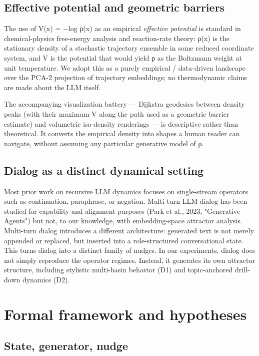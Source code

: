\documentclass{article}
\theoremstyle{plain}
\theoremstyle{definition}
\begin{document}
\subsection{Effective potential and geometric barriers}

The use of V(x) = −log ρ(x) as an empirical \textit{effective potential} is
standard in chemical-physics free-energy analysis and reaction-rate
theory: ρ(x) is the stationary density of a stochastic trajectory
ensemble in some reduced coordinate system, and V is the potential
that would yield ρ as the Boltzmann weight at unit temperature. We
adopt this as a purely empirical / data-driven landscape over the
PCA-2 projection of trajectory embeddings; no thermodynamic claims
are made about the LLM itself.

The accompanying visualization battery — Dijkstra geodesics between
density peaks (with their maximum-V along the path used as a
geometric barrier estimate) and volumetric iso-density renderings —
is descriptive rather than theoretical. It converts the empirical
density into shapes a human reader can navigate, without assuming
any particular generative model of ρ.

\subsection{Dialog as a distinct dynamical setting}

Most prior work on recursive LLM dynamics focuses on single-stream
operators such as continuation, paraphrase, or negation. Multi-turn
LLM dialog has been studied for capability and alignment purposes
(Park et al., 2023, "Generative Agents") but not, to our knowledge,
with embedding-space attractor analysis. Multi-turn dialog introduces
a different architecture: generated text is not merely appended or
replaced, but inserted into a role-structured conversational state.
This turns dialog into a distinct family of nudges. In our experiments,
dialog does not simply reproduce the operator regimes. Instead, it
generates its own attractor structure, including stylistic
multi-basin behavior (D1) and topic-anchored drill-down dynamics (D2).


\section{Formal framework and hypotheses}

\subsection{State, generator, nudge}
\end{document}
